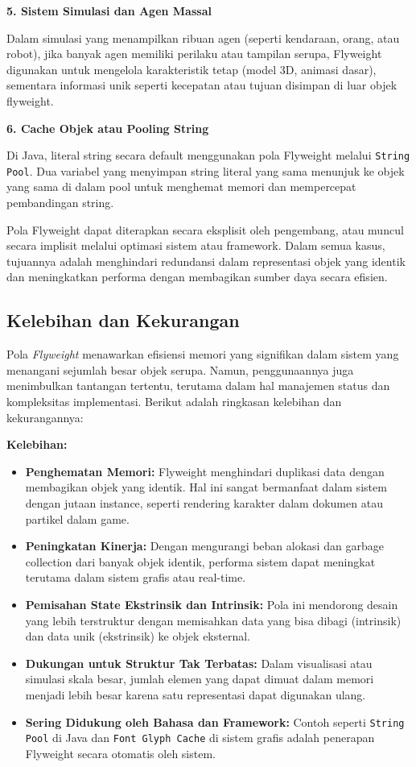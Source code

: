 \textbf{5. Sistem Simulasi dan Agen Massal}

Dalam simulasi yang menampilkan ribuan agen (seperti kendaraan, orang, atau robot), jika banyak agen memiliki perilaku atau tampilan serupa, Flyweight digunakan untuk mengelola karakteristik tetap (model 3D, animasi dasar), sementara informasi unik seperti kecepatan atau tujuan disimpan di luar objek flyweight.

\textbf{6. Cache Objek atau Pooling String}

Di Java, literal string secara default menggunakan pola Flyweight melalui \texttt{String Pool}. Dua variabel yang menyimpan string literal yang sama menunjuk ke objek yang sama di dalam pool untuk menghemat memori dan mempercepat pembandingan string.

Pola Flyweight dapat diterapkan secara eksplisit oleh pengembang, atau muncul secara implisit melalui optimasi sistem atau framework. Dalam semua kasus, tujuannya adalah menghindari redundansi dalam representasi objek yang identik dan meningkatkan performa dengan membagikan sumber daya secara efisien.

\subsection{Kelebihan dan Kekurangan}

Pola \textit{Flyweight} menawarkan efisiensi memori yang signifikan dalam sistem yang menangani sejumlah besar objek serupa. Namun, penggunaannya juga menimbulkan tantangan tertentu, terutama dalam hal manajemen status dan kompleksitas implementasi. Berikut adalah ringkasan kelebihan dan kekurangannya:

\textbf{Kelebihan:}
\begin{itemize}
	\item \textbf{Penghematan Memori:} Flyweight menghindari duplikasi data dengan membagikan objek yang identik. Hal ini sangat bermanfaat dalam sistem dengan jutaan instance, seperti rendering karakter dalam dokumen atau partikel dalam game.
	
	\item \textbf{Peningkatan Kinerja:} Dengan mengurangi beban alokasi dan garbage collection dari banyak objek identik, performa sistem dapat meningkat terutama dalam sistem grafis atau real-time.
	
	\item \textbf{Pemisahan State Ekstrinsik dan Intrinsik:} Pola ini mendorong desain yang lebih terstruktur dengan memisahkan data yang bisa dibagi (intrinsik) dan data unik (ekstrinsik) ke objek eksternal.
	
	\item \textbf{Dukungan untuk Struktur Tak Terbatas:} Dalam visualisasi atau simulasi skala besar, jumlah elemen yang dapat dimuat dalam memori menjadi lebih besar karena satu representasi dapat digunakan ulang.
	
	\item \textbf{Sering Didukung oleh Bahasa dan Framework:} Contoh seperti \texttt{String Pool} di Java dan \texttt{Font Glyph Cache} di sistem grafis adalah penerapan Flyweight secara otomatis oleh sistem.
\end{itemize}

